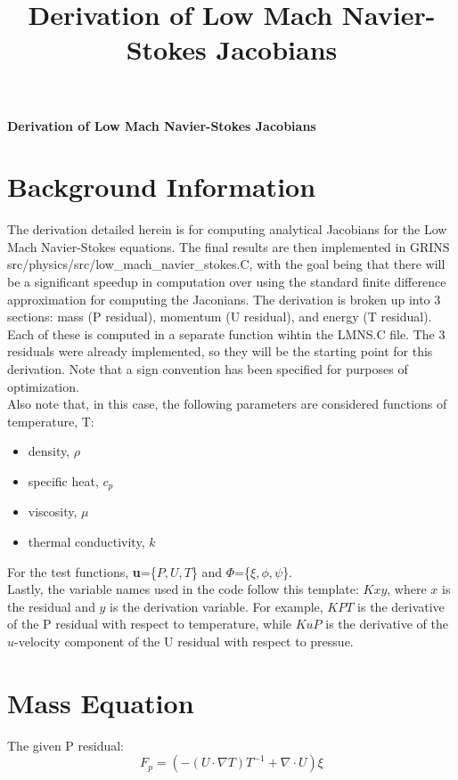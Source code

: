 \documentclass[10pt]{article}
\title{Derivation of Low Mach Navier-Stokes Jacobians}
\date{}
\begin{document}
\begin{center}
\textbf{Derivation of Low Mach Navier-Stokes Jacobians}
\end{center}

\section{Background Information}
The derivation detailed herein is for computing analytical Jacobians for the Low Mach Navier-Stokes equations. The final results are then implemented in GRINS src/physics/src/low\_mach\_navier\_stokes.C, with the goal being that there
will be a significant speedup in computation over using the standard finite difference approximation for computing the Jaconians. The derivation is broken up into 3 sections: mass (P residual), momentum (U residual), and energy (T residual).
Each of these is computed in a separate function wihtin the LMNS.C file.  The 3 residuals were already implemented, so they will be the starting point for this derivation. Note that a sign convention has been specified for 
purposes of optimization.\\
Also note that, in this case, the following parameters are considered functions of temperature, T:
\begin{itemize}
    \item density, $\rho$
    \item specific heat, $c_p$
    \item viscosity, $\mu$
    \item thermal conductivity, $k$
\end{itemize}
For the test functions, \textbf{u}=\{$P,U,T$\} and \textbf{$\Phi$}=\{$\xi,\phi,\psi$\}.\\
Lastly, the variable names used in the code follow this template: $Kxy$, where $x$ is the residual and $y$ is the derivation variable.  For example, $KPT$ is the derivative of the P residual with respect to temperature,
while $KuP$ is the derivative of the $u$-velocity component of the U residual with respect to pressue. 


\section{Mass Equation}
The given P residual:
\begin{equation}
    F_p = (-(U \cdot \nabla T) T^{-1} + \nabla \cdot U)\xi
\end{equation}
\end{document}
